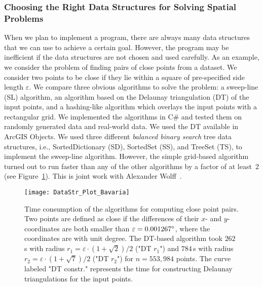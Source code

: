 \subsubsection{Choosing the Right Data Structures 
	for Solving Spatial Problems}

When we plan to implement a program, 
there are always many data structures that
we can use to achieve a certain goal.
However, the program may be inefficient
if the data structures are not chosen and used carefully.
As an example, we consider the problem of 
finding pairs of close points from a dataset. 
We consider two points to be close 
if they lie within a square of pre-specified 
side length $\varepsilon$. 
We compare three obvious algorithms to solve the problem: 
a sweep-line (SL) algorithm, 
an algorithm based on the Delaunay triangulation (DT) 
of the input points, 
and a hashing-like algorithm 
which overlays the input points with a rectangular grid. 
We implemented the algorithms in C\# and tested them on 
randomly generated data and real-world data. 
We used the DT available in ArcGIS Objects. 
We used three different \emph{balanced binary search} 
tree data structures, 
i.e., SortedDictionary (SD), SortedSet (SS), and TreeSet (TS), 
to implement the sweep-line algorithm. 
However, the simple grid-based algorithm 
turned out to run faster than 
any of the other algorithms 
by a factor of at least~$2$ 
(see Figure~\ref{fig:Intro_DataStructure}).
This is joint work with Alexander Wolff~\cite{Peng2014DataStr}.


\begin{figure}[tb]
	\centering
	\texttt{[image: DataStr\_Plot\_Bavaria]}
	\caption{Time consumption of the algorithms
		for computing close point pairs. 
		Two points are defined as close if the differences 
		of their $x$- and $y$- coordinates are both smaller than
		$\varepsilon=0.001267 \degree$,
		where the coordinates are with unit degree. 
		The DT-based algorithm took $262\,$s 
		with radius $r_1=\varepsilon \cdot (1+\sqrt{2})/2$ 
		("DT $r_1$") and $784\,$s 
		with radius $r_2=\varepsilon \cdot (1+\sqrt{7})/2$ 
		("DT $r_2$") for $n=553{,}984$ points.
		The curve labeled "DT constr." represents 
		the time for constructing 
		Delaunay triangulations for the input points.
	}
	\label{fig:Intro_DataStructure}
\end{figure}

